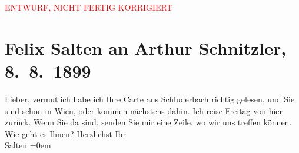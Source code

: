 
\begin{center}
            \textcolor{red}{ENTWURF, NICHT FERTIG KORRIGIERT}
                      \end{center}
            
         \renewcommand{\erwaehnteOrte}{Orte: Carbonin, Unterach am Attersee, Wien}
         \renewcommand{\erwaehnteWerke}{}
               \section[Felix Salten an Arthur Schnitzler, 8. 8. 1899]{ Felix Salten an Arthur Schnitzler, 8. 8. 1899}\nopagebreak{}\rehead{ }\begin{ledgroupsized}[t]{13cm}\normalsize\beginnumbering \toendnotes[C]{\smallbreak\pagebreak[2]} 
\pstart
           \noindent{}{\pb}Lieber, vermutlich habe ich Ihre Carte aus Schluderbach richtig gelesen, und Sie sind schon in Wien, oder kommen nächstens dahin. Ich reise
                  Freitag von hier zurück. \pend
           \pstart
           Wenn Sie da sind, senden Sie mir eine Zeile, wo wir uns treffen können. \pend
           \pstart
           Wie geht es Ihnen? \pend
           \pstart
           Herzlichst Ihr {\\[\baselineskip]}\spacefill\mbox{Salten}\pend
           \leftskip=0em{}
         
         \endnumbering{}\end{ledgroupsized}\begin{anhang}\end{anhang}\newcommand{\dateiname}{L03296}\newcommand{\titel}{Felix Salten an Arthur Schnitzler, 8. 8. 1899}\newcommand{\editorInnen}{Martin Anton Müller und Laura Untner}
      